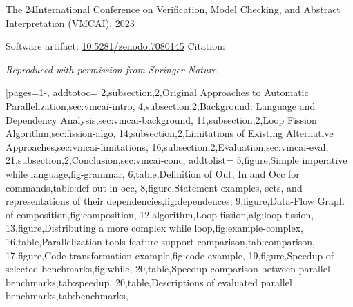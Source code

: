 \pageIconOpt
\ainfoX{\CTNT}
{The 24\thsup International Conference on Verification, Model Checking, and Abstract Interpretation (VMCAI), 2023}
{Software artifact: \href{https://zenodo.org/records/7080145}{10.5281/zenodo.7080145}\newline
Citation:~\cite{aubert202213}\par
\textit{Reproduced with permission from Springer Nature.}}
[pages={1-},
    addtotoc={
        2,subsection,2,{Original Approaches to Automatic Parallelization},sec:vmcai-intro,
        4,subsection,2,{Background: Language and Dependency Analysis},sec:vmcai-background,
        11,subsection,2,{Loop Fission Algorithm},sec:fission-algo,
        14,subsection,2,{Limitations of Existing Alternative Approaches},sec:vmcai-limitations,
        16,subsection,2,{Evaluation},sec:vmcai-eval,
        21,subsection,2,{Conclusion},sec:vmcai-conc},
    addtolist={
        5,figure,{Simple imperative while language},fig-grammar,
        6,table,{Definition of Out, In and Occ for commands},table:def-out-in-occ,
        8,figure,{Statement examples, sets, and representations of their dependencies},fig:dependences,
        9,figure,{Data-Flow Graph of composition},fig:composition,
        12,algorithm,{Loop fission},alg:loop-fission,
        13,figure,{Distributing a more complex while loop},fig:example-complex,
        16,table,{Parallelization tools feature support comparison},tab:comparison,
        17,figure,{Code transformation example},fig:code-example,
        19,figure,{Speedup of selected benchmarks},fig:while,
        20,table,{Speedup comparison between parallel benchmarks},tab:speedup,
        20,table,{Descriptions of evaluated parallel benchmarks},tab:benchmarks},
